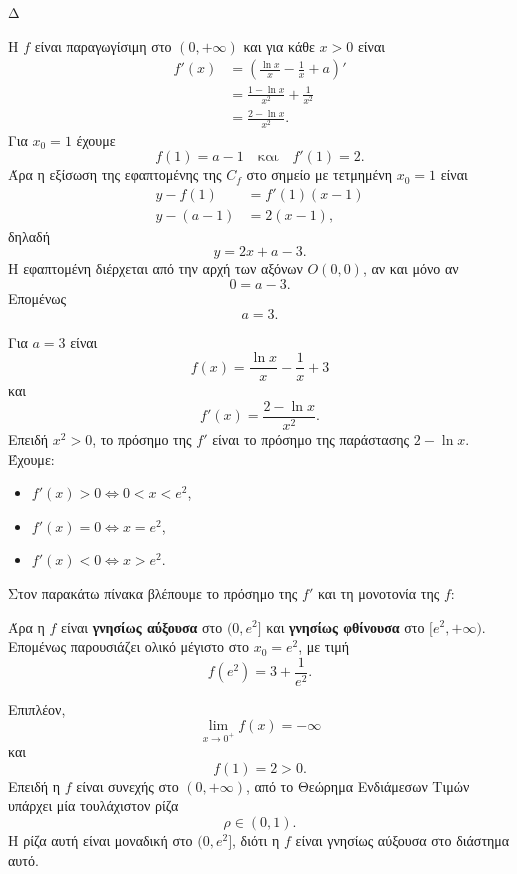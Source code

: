 \begin{thema}{Δ}
\begin{erwthma}
\item Η $f$ είναι παραγωγίσιμη στο $(0,+\infty)$ και για κάθε $x>0$ είναι
\begin{align*}
f'(x)
&=\left(\frac{\ln x}{x}-\frac{1}{x}+a\right)'\\
&=\frac{1-\ln x}{x^2}+\frac{1}{x^2}\\
&=\frac{2-\ln x}{x^2}.
\end{align*}
Για $x_0=1$ έχουμε
\[
f(1)=a-1
\quad\text{και}\quad
f'(1)=2.
\]
Άρα η εξίσωση της εφαπτομένης της $C_f$ στο σημείο με τετμημένη $x_0=1$ είναι
\begin{align*}
y-f(1)&=f'(1)(x-1)\\
y-(a-1)&=2(x-1),
\end{align*}
δηλαδή
\[
y=2x+a-3.
\]
Η εφαπτομένη διέρχεται από την αρχή των αξόνων $O(0,0)$, αν και μόνο αν
\[
0=a-3.
\]
Επομένως
\[
{a=3}.
\]

\item Για $a=3$ είναι
\[
f(x)=\frac{\ln x}{x}-\frac{1}{x}+3
\]
και
\[
f'(x)=\frac{2-\ln x}{x^2}.
\]
Επειδή $x^2>0$, το πρόσημο της $f'$ είναι το πρόσημο της παράστασης $2-\ln x$. Έχουμε:
\begin{itemize}
\item $f'(x)>0\Leftrightarrow 0<x<e^2$,
\item $f'(x)=0\Leftrightarrow x=e^2$,
\item $f'(x)<0\Leftrightarrow x>e^2$.
\end{itemize}
Στον παρακάτω πίνακα βλέπουμε το πρόσημο της $f'$ και τη μονοτονία της $f$:
\begin{center}
\end{center}

Άρα η $f$ είναι \textbf{γνησίως αύξουσα} στο $(0,e^2]$ και \textbf{γνησίως φθίνουσα} στο $[e^2,+\infty)$. Επομένως παρουσιάζει ολικό μέγιστο στο $x_0=e^2$, με τιμή
\[
{f(e^2)=3+\frac{1}{e^2}}.
\]

Επιπλέον,
\[
\lim_{x\to0^+}f(x)=-\infty
\]
και
\[
f(1)=2>0.
\]
Επειδή η $f$ είναι συνεχής στο $(0,+\infty)$, από το Θεώρημα Ενδιάμεσων Τιμών υπάρχει μία τουλάχιστον ρίζα
\[
\rho\in(0,1).
\]
Η ρίζα αυτή είναι μοναδική στο $(0,e^2]$, διότι η $f$ είναι γνησίως αύξουσα στο διάστημα αυτό.


\end{erwthma}
\end{thema}
